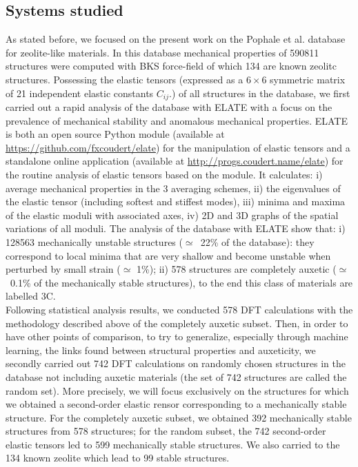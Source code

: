 \documentclass[journal=jacsat,manuscript=article]{achemso}
\begin{document}
\subsection{Systems studied}
As stated before, we focused on the present work on the Pophale et al. \cite{vanBeest1990} database for zeolite-like materials. In this database mechanical properties of 590811 structures were computed with BKS force-field of which 134 are known zeolitc structures. Possessing the elastic tensors (expressed as a $6\times 6$ symmetric matrix of 21 independent elastic constants $C_{ij}$.\cite{Nye1985}) of all structures in the database, we first carried out a rapid analysis of the database with ELATE with a focus on the prevalence of mechanical stability and anomalous mechanical properties. ELATE is both an open source Python module (available at \url{ https://github.com/fxcoudert/elate}) for the manipulation of elastic tensors and a standalone online application (available at \url{http://progs.coudert.name/elate}) for the routine analysis of elastic tensors based on the module. It calculates: i) average mechanical properties in the 3 averaging schemes, ii) the eigenvalues of the elastic tensor (including softest and stiffest modes), iii) minima and maxima of the elastic moduli with associated axes, iv) 2D and 3D graphs of the spatial variations of all moduli. The analysis of the database with ELATE show that: i) 128563 mechanically unstable structures ($\simeq$~22\% of the database): they correspond to local minima that are very shallow and become unstable when perturbed by small strain ($\simeq$ 1\%); ii) 578 structures are completely auxetic ($\simeq$~0.1\% of the mechanically stable structures), to the end this class of materials are labelled 3C.\\
Following statistical analysis results, we conducted 578 DFT calculations with the methodology described above of the completely auxetic subset. Then, in order to have other points of comparison, to try to generalize, especially through machine learning, the links found between structural properties and auxeticity, we secondly carried out 742 DFT calculations on randomly chosen structures in the database not including auxetic materials (the set of 742 structures are called the random set). More precisely, we will focus exclusively on the structures for which we obtained a second-order elastic rensor corresponding to a mechanically stable structure. For the completely auxetic subset, we obtained 392 mechanically stable structures from 578 structures; for the random subset, the 742 second-order elastic tensors led to 599 mechanically stable structures. We also carried to the 134 known zeolite which lead to 99 stable structures.
\end{document}
